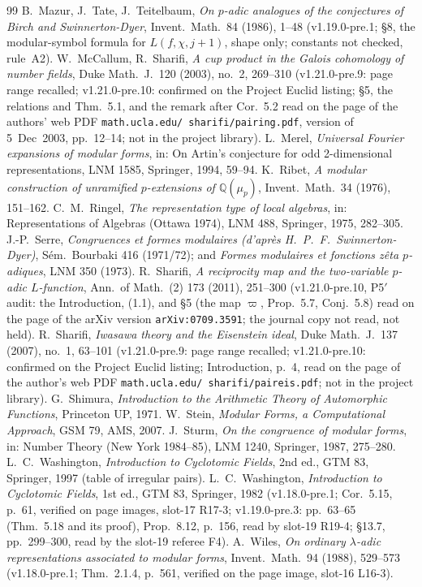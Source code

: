 \documentclass[11pt]{article}
\theoremstyle{remark}
\newcommand{\Q}{\mathbb{Q}}
\begin{document}
\begin{thebibliography}{99}
 B.~Mazur, J.~Tate, J.~Teitelbaum, \emph{On $p$-adic analogues of the conjectures of Birch and Swinnerton-Dyer}, Invent.\ Math.\ 84 (1986), 1--48
(v1.19.0-pre.1; \S8, the modular-symbol formula for $L(f,\chi,j+1)$, shape only; constants not checked, rule~A2).
 W.~McCallum, R.~Sharifi, \emph{A cup product in the Galois cohomology of number fields}, Duke Math.\ J.\ 120 (2003), no.~2, 269--310 (v1.21.0-pre.9: page range recalled; v1.21.0-pre.10: confirmed on the Project Euclid listing;
\S5, the relations and Thm.~5.1, and the remark after Cor.~5.2 read on the page of the authors' web PDF \texttt{math.ucla.edu/\string~sharifi/pairing.pdf}, version of 5~Dec~2003, pp.~12--14; not in the project library).
 L.~Merel, \emph{Universal Fourier expansions of modular forms}, in: On Artin's conjecture for odd 2-dimensional representations, LNM 1585, Springer, 1994, 59--94.
 K.~Ribet, \emph{A modular construction of unramified $p$-extensions of $\Q(\mu_p)$}, Invent.\ Math.\ 34 (1976), 151--162.
 C.~M.~Ringel, \emph{The representation type of local algebras}, in: Representations of Algebras (Ottawa 1974), LNM 488, Springer, 1975, 282--305.
 J.-P.~Serre, \emph{Congruences et formes modulaires (d'apr\`es H.~P.~F.~Swinnerton-Dyer)}, S\'em.\ Bourbaki 416 (1971/72); and \emph{Formes modulaires et fonctions z\^eta $p$-adiques}, LNM 350 (1973).
 R.~Sharifi, \emph{A reciprocity map and the two-variable $p$-adic $L$-function}, Ann.\ of Math.\ (2) 173 (2011), 251--300 (v1.21.0-pre.10, P5$'$ audit: the Introduction, (1.1), and \S5 (the map $\varpi$, Prop.~5.7, Conj.~5.8)
read on the page of the arXiv version \texttt{arXiv:0709.3591}; the journal copy not read, not held).
 R.~Sharifi, \emph{Iwasawa theory and the Eisenstein ideal}, Duke Math.\ J.\ 137 (2007), no.~1, 63--101 (v1.21.0-pre.9: page range recalled; v1.21.0-pre.10: confirmed on the Project Euclid listing; Introduction, p.~4,
read on the page of the author's web PDF \texttt{math.ucla.edu/\string~sharifi/paireis.pdf}; not in the project library).
 G.~Shimura, \emph{Introduction to the Arithmetic Theory of Automorphic Functions}, Princeton UP, 1971.
 W.~Stein, \emph{Modular Forms, a Computational Approach}, GSM 79, AMS, 2007.
 J.~Sturm, \emph{On the congruence of modular forms}, in: Number Theory (New York 1984--85), LNM 1240, Springer, 1987, 275--280.
 L.~C.~Washington, \emph{Introduction to Cyclotomic Fields}, 2nd ed., GTM 83, Springer, 1997 (table of irregular pairs).
 L.~C.~Washington, \emph{Introduction to Cyclotomic Fields}, 1st ed., GTM 83, Springer, 1982 (v1.18.0-pre.1; Cor.~5.15, p.~61, verified on page images, slot-17 R17-3;
v1.19.0-pre.3: pp.~63--65 (Thm.~5.18 and its proof), Prop.~8.12, p.~156, read by slot-19 R19-4; \S13.7, pp.~299--300, read by the slot-19 referee F4).
 A.~Wiles, \emph{On ordinary $\lambda$-adic representations associated to modular forms}, Invent.\ Math.\ 94 (1988), 529--573 (v1.18.0-pre.1; Thm.~2.1.4, p.~561, verified on the page image, slot-16 L16-3).
\end{thebibliography}
\endgroup
\end{document}
